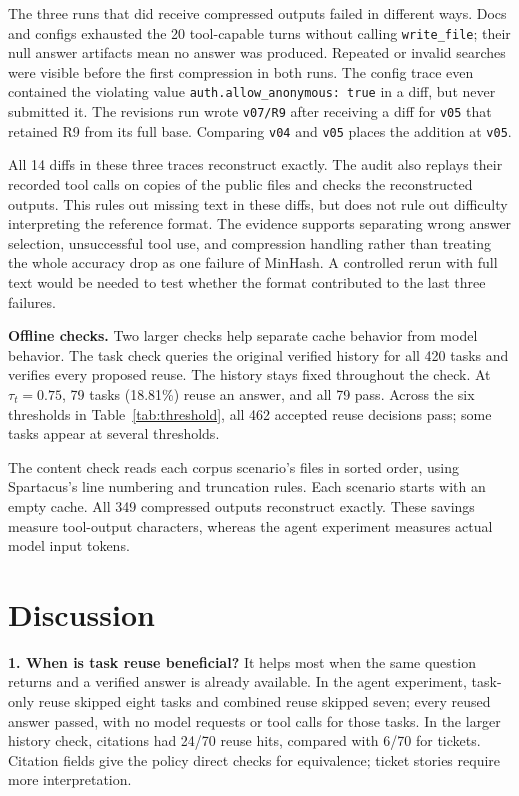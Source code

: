 \documentclass[10pt]{article}
\begin{document}
The three runs that did receive compressed outputs failed in different ways.
Docs and configs exhausted the 20 tool-capable turns without calling
\texttt{write\_file}; their null answer artifacts mean no answer was produced.
Repeated or invalid searches were visible before the first compression in
both runs. The config trace even contained the violating value
\texttt{auth.allow\_anonymous: true} in a diff, but never submitted it.
The revisions run wrote \texttt{v07/R9} after receiving a diff for \texttt{v05}
that retained R9 from its full base. Comparing \texttt{v04} and \texttt{v05}
places the addition at \texttt{v05}.

All 14 diffs in these three traces reconstruct exactly. The audit also
replays their recorded tool calls on copies of the public files and checks
the reconstructed outputs. This rules out missing text in these diffs, but
does not rule out difficulty interpreting the reference format. The evidence
supports separating wrong answer selection, unsuccessful tool use, and
compression handling rather than treating the whole accuracy drop as one
failure of MinHash. A controlled rerun with full text would be needed to test
whether the format contributed to the last three failures.

\textbf{Offline checks.} Two larger checks help separate cache behavior from
model behavior. The task check queries the original verified history for all
420 tasks and verifies every proposed reuse. The history stays fixed throughout
the check. At $\tau_t=0.75$, 79 tasks (18.81\%) reuse an answer, and all 79 pass.
Across the six thresholds in Table~\ref{tab:threshold}, all 462 accepted reuse
decisions pass; some tasks appear at several thresholds.

The content check reads each corpus scenario's files in sorted order, using
Spartacus's line numbering and truncation rules. Each scenario starts with an
empty cache. All 349 compressed outputs reconstruct exactly. These savings
measure tool-output characters, whereas the agent experiment measures actual
model input tokens.



\section{Discussion}
\textbf{1. When is task reuse beneficial?}
It helps most when the same question returns and a verified answer is already
available. In the agent experiment, task-only reuse skipped eight tasks and
combined reuse skipped seven; every reused answer passed, with no model
requests or tool calls for those tasks. In the larger history check, citations
had 24/70 reuse hits, compared with 6/70 for tickets. Citation fields give the
policy direct checks for equivalence; ticket stories require more interpretation.
\end{document}
